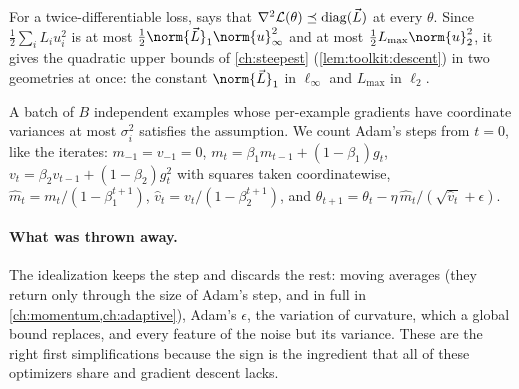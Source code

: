 \begin{refsection}
For a twice-differentiable loss,  says that $\nabla^2\mathcal{L}(\theta)\preceq\operatorname{diag}(\vec L)$ at every $\theta$. Since $\frac12\sum_iL_iu_i^2$ is at most $\frac12\norm{\vec L}_1\norm{u}_\infty^2$ and at most $\frac12L_{\max}\norm{u}_2^2$, it gives the quadratic upper bounds of \cref{ch:steepest} (\cref{lem:toolkit:descent}) in two geometries at once: the constant $\norm{\vec L}_1$ in $\ell_\infty$ and $L_{\max}$ in $\ell_2$.



A batch of $B$ independent examples whose per-example gradients have coordinate variances at most $\sigma_i^2$ satisfies the assumption. We count Adam's steps from $t=0$, like the iterates: $m_{-1}=v_{-1}=0$, $m_t=\beta_1m_{t-1}+(1-\beta_1)g_t$, $v_t=\beta_2v_{t-1}+(1-\beta_2)g_t^2$ with squares taken coordinatewise, $\hat m_t=m_t/(1-\beta_1^{t+1})$, $\hat v_t=v_t/(1-\beta_2^{t+1})$, and $\theta_{t+1}=\theta_t-\eta\,\hat m_t/(\sqrt{\hat v_t}+\epsilon)$.

\paragraph{What was thrown away.} The idealization keeps the step and discards the rest: moving averages (they return only through the size of Adam's step, and in full in \cref{ch:momentum,ch:adaptive}), Adam's $\epsilon$, the variation of curvature, which a global bound replaces, and every feature of the noise but its variance. These are the right first simplifications because the sign is the ingredient that all of these optimizers share and gradient descent lacks.


\end{refsection}

